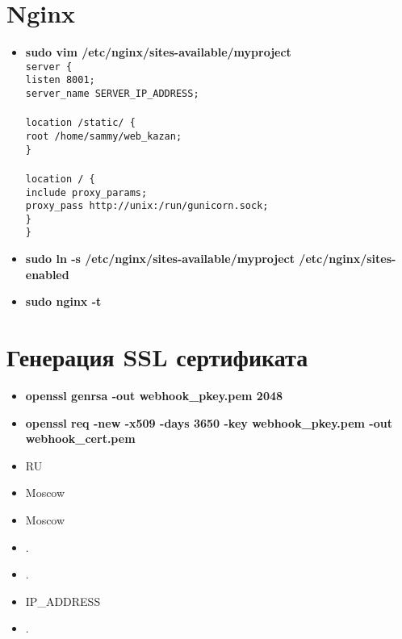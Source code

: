 \documentclass[14pt,a4paper,oneside]{extarticle}
\begin{document}
    \newpage
    \section{Nginx}
        \begin{itemize}
            \item \textbf{sudo vim /etc/nginx/sites-available/myproject} \\

            \texttt{server \{ \\
                    listen 8001;\\
                    server\_name SERVER\_IP\_ADDRESS;\\
                    \\
                    location /static/ \{ \\
                        root /home/sammy/web\_kazan; \\
                    \} \\
                    \\
                    location / \{ \\
                        include proxy\_params; \\
                        proxy\_pass http://unix:/run/gunicorn.sock; \\
                    \} \\
                \} \\}
            
            \item \textbf{sudo ln -s /etc/nginx/sites-available/myproject /etc/nginx/sites-enabled}
            \item \textbf{sudo nginx -t}
        \end{itemize}

    \newpage
    \section{Генерация SSL сертификата}

        \begin{itemize}
            \item \textbf{openssl genrsa -out webhook\_pkey.pem 2048}
            \item \textbf{openssl req -new -x509 -days 3650 -key webhook\_pkey.pem -out webhook\_cert.pem}
            \item RU
            \item Moscow
            \item Moscow
            \item .
            \item .
            \item IP\_ADDRESS
            \item .
        \end{itemize}
    
\end{document}
